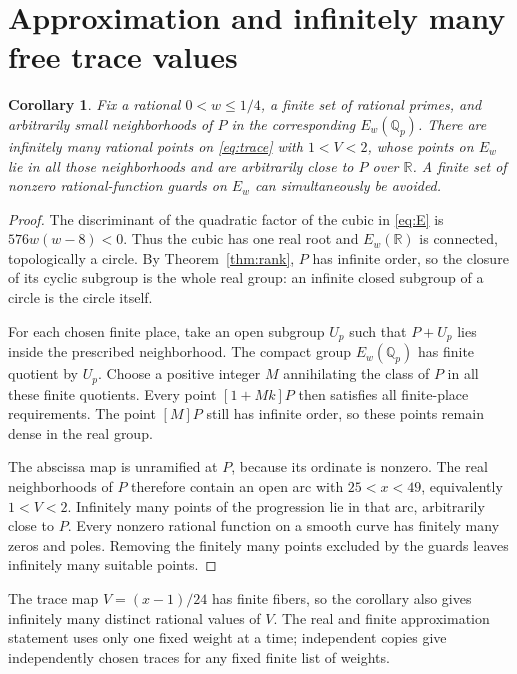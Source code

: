 \documentclass[11pt,a4paper]{article}
\newtheorem{corollary}[theorem]{Corollary}
\newcommand{\Q}{\mathbb Q}\newcommand{\Z}{\mathbb Z}\newcommand{\R}{\mathbb R}
\begin{document}
\section{Approximation and infinitely many free trace values}

\begin{corollary}\label{cor:density}
Fix a rational \(0<w\le1/4\), a finite set of rational primes, and
arbitrarily small neighborhoods of \(P\) in the corresponding
\(E_w(\Q_p)\). There are infinitely many rational points on
\eqref{eq:trace} with \(1<V<2\), whose points on \(E_w\) lie in
all those neighborhoods and are arbitrarily close to \(P\) over
\(\R\). A finite set of nonzero rational-function guards on
\(E_w\) can simultaneously be avoided.
\end{corollary}
\begin{proof}
The discriminant of the quadratic factor of the cubic in
\eqref{eq:E} is \(576w(w-8)<0\). Thus the cubic has one real root
and \(E_w(\R)\) is connected, topologically a circle.
By Theorem~\ref{thm:rank}, \(P\) has infinite order, so the closure
of its cyclic subgroup is the whole real group: an infinite closed
subgroup of a circle is the circle itself.

For each chosen finite place, take an open subgroup \(U_p\) such
that \(P+U_p\) lies inside the prescribed neighborhood. The compact
group \(E_w(\Q_p)\) has finite quotient by \(U_p\). Choose a
positive integer \(M\) annihilating the class of \(P\) in all
these finite quotients. Every point \([1+Mk]P\) then satisfies all
finite-place requirements. The point \([M]P\) still has infinite
order, so these points remain dense in the real group.

The abscissa map is unramified at \(P\), because its ordinate is
nonzero. The real neighborhoods of \(P\) therefore contain an open
arc with \(25<x<49\), equivalently \(1<V<2\).
Infinitely many points of the progression lie in that arc, arbitrarily
close to \(P\). Every nonzero rational function on a smooth curve
has finitely many zeros and poles. Removing the finitely many points
excluded by the guards leaves infinitely many suitable points.
\end{proof}

The trace map \(V=(x-1)/24\) has finite fibers, so the corollary
also gives infinitely many distinct rational values of \(V\).
The real and finite approximation statement uses only one fixed
weight at a time; independent copies give independently chosen traces
for any fixed finite list of weights.
\end{document}
